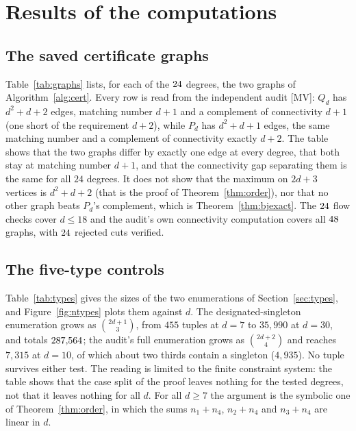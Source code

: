 \documentclass[11pt]{article}
\theoremstyle{remark}
\begin{document}
\section{Results of the computations}\label{sec:results}

\subsection{The saved certificate graphs}

Table~\ref{tab:graphs} lists, for each of the $24$ degrees, the two graphs of Algorithm~\ref{alg:cert}. Every row is read from the independent audit [MV]: $Q_d$ has $d^2+d+2$ edges, matching number $d+1$ and a complement of connectivity $d+1$ (one short of the requirement $d+2$), while $P_d$ has $d^2+d+1$ edges, the same matching number and a complement of connectivity exactly $d+2$. The table shows that the two graphs differ by exactly one edge at every degree, that both stay at matching number $d+1$, and that the connectivity gap separating them is the same for all $24$ degrees. It does not show that the maximum on $2d+3$ vertices is $d^2+d+2$ (that is the proof of Theorem~\ref{thm:order}), nor that no other graph beats $P_d$'s complement, which is Theorem~\ref{thm:bjexact}. The $24$ flow checks cover $d\le18$ and the audit's own connectivity computation covers all $48$ graphs, with $24$ rejected cuts verified.

\begin{table}[ht]
\centering\footnotesize

\caption{The $48$ saved graphs for $d=7,\ldots,30$: edges, matching number $\nu$ and connectivity $\kappa$ of the complement for the shared-neighbourhood maximizer $Q_d$ and the subdivided crown $P_d$, as recomputed by the independent NetworkX audit; the column ``flow'' marks the degrees at which the main run also performed a direct flow-connectivity check.}
\label{tab:graphs}
\end{table}

\subsection{The five-type controls}

Table~\ref{tab:types} gives the sizes of the two enumerations of Section~\ref{sec:types}, and Figure~\ref{fig:ntypes} plots them against $d$. The designated-singleton enumeration grows as $\binom{2d+1}{3}$, from $455$ tuples at $d=7$ to $35{,}990$ at $d=30$, and totals $287{,}564$; the audit's full enumeration grows as $\binom{2d+2}{4}$ and reaches $7{,}315$ at $d=10$, of which about two thirds contain a singleton ($4{,}935$). No tuple survives either test. The reading is limited to the finite constraint system: the table shows that the case split of the proof leaves nothing for the tested degrees, not that it leaves nothing for all $d$. For all $d\ge7$ the argument is the symbolic one of Theorem~\ref{thm:order}, in which the sums $n_1+n_4$, $n_2+n_4$ and $n_3+n_4$ are linear in $d$.
\end{document}

